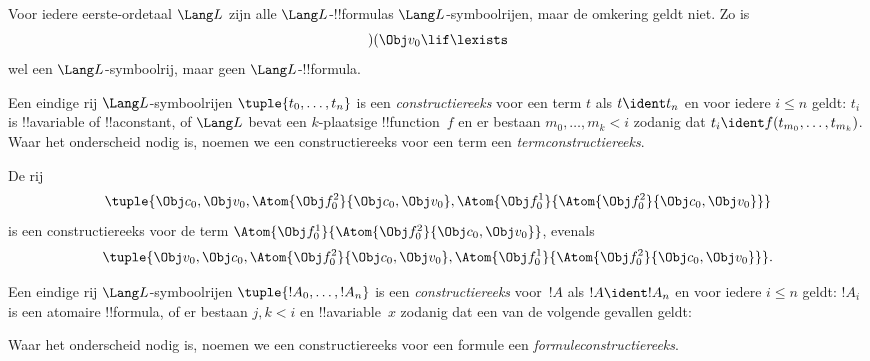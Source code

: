 \documentclass[openany]{memoir}
\begin{document}
\begin{ex}
Voor iedere eerste-ordetaal $\Lang L$ zijn alle
$\Lang L$-!!{formula}s $\Lang L$-symboolrijen, maar de omkering geldt
niet. Zo is \[)(\Obj v_0\lif\lexists\] wel een
$\Lang L$-symboolrij, maar geen $\Lang L$-!!{formula}.
\end{ex}

\begin{defn}
Een eindige rij $\Lang L$-symboolrijen $\tuple{t_0,\dotsc,t_n}$ is een
\emph{constructiereeks} voor een term $t$ als $t \ident t_n$ en voor
iedere $i \leq n$ geldt: $t_i$ is !!a{variable} of !!a{constant}, of
$\Lang L$ bevat een $k$-plaatsige !!{function}~$f$ en er bestaan
$m_0,\dotsc,m_k < i$ zodanig dat $t_i \ident
f(t_{m_0},\dotsc,t_{m_k})$. Waar het onderscheid nodig is, noemen we
een constructiereeks voor een term een \emph{termconstructiereeks}.
\end{defn}

\begin{ex}
De rij
\[
    \tuple{\Obj c_0, \Obj v_0, \Atom{\Obj f^2_0}{\Obj c_0, \Obj v_0}, \Atom{\Obj f^1_0}{\Atom{\Obj f^2_0}{\Obj c_0, \Obj v_0}}}
\]
is een constructiereeks voor de term $\Atom{\Obj f^1_0}{\Atom{\Obj
f^2_0}{\Obj c_0, \Obj v_0}}$, evenals
\[
    \tuple{\Obj v_0, \Obj c_0, \Atom{\Obj f^2_0}{\Obj c_0, \Obj v_0}, \Atom{\Obj f^1_0}{\Atom{\Obj f^2_0}{\Obj c_0, \Obj v_0}}}.
\]
\end{ex}

\begin{defn}
Een eindige rij $\Lang L$-symboolrijen $\tuple{!A_0,\dotsc,!A_n}$
is een \emph{constructiereeks} voor~$!A$ als $!A \ident !A_n$ en
voor iedere $i \leq n$ geldt: $!A_i$ is een atomaire !!{formula}, of
er bestaan $j,k < i$ en !!a{variable}~$x$ zodanig dat een van de
volgende gevallen geldt:
\begin{enumerate}
\end{enumerate}
Waar het onderscheid nodig is, noemen we een constructiereeks voor een
formule een \emph{formuleconstructiereeks}.
\end{defn}
\end{document}
